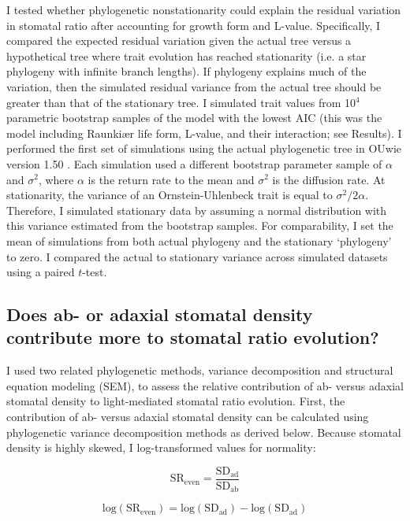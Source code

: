 \documentclass[12pt, oneside]{article}
\newcommand{\pkg}[1]{{\fontseries{b}\selectfont #1}}
\newcommand{\el}{L-value}
\begin{document}
I tested whether phylogenetic nonstationarity could explain the residual variation in stomatal ratio after accounting for growth form and \el. Specifically, I compared the expected residual variation given the actual tree versus a hypothetical tree where trait evolution has reached stationarity (i.e. a star phylogeny with infinite branch lengths). If phylogeny explains much of the variation, then the simulated residual variance from the actual tree should be greater than that of the stationary tree. I simulated trait values from 10$^4$ parametric bootstrap samples of the model with the lowest AIC (this was the model including Raunki\ae r life form, \el, and their interaction; see Results). I performed the first set of simulations using the actual phylogenetic tree in \pkg{OUwie} version 1.50 \citep{Beaulieu_OMeara_2016}. Each simulation used a different bootstrap parameter sample of $\alpha$ and $\sigma ^ 2$, where $\alpha$ is the return rate to the mean and $\sigma ^ 2$ is the diffusion rate. At stationarity, the variance of an Ornstein-Uhlenbeck trait is equal to $\sigma ^ 2 / 2 \alpha$. Therefore, I simulated stationary data by assuming a normal distribution with this variance estimated from the bootstrap samples. For comparability, I set the mean of simulations from both actual phylogeny and the stationary `phylogeny' to zero. I compared the actual to stationary variance across simulated datasets using a paired $t$-test.

\subsection*{Does ab- or adaxial stomatal density contribute more to stomatal ratio evolution?}

I used two related phylogenetic methods, variance decomposition and structural equation modeling (SEM), to assess the relative contribution of ab- versus adaxial stomatal density to light-mediated stomatal ratio evolution. First, the contribution of ab- versus adaxial stomatal density can be calculated using phylogenetic variance decomposition methods as derived below. Because stomatal density is highly skewed, I log-transformed values for normality:
 
\begin{equation} \label{eq:SReven2} 
  \mathrm{SR_{even}} = \frac{\mathrm{SD_{ad}}}{\mathrm{SD_{ab}}}
\end{equation}

\begin{equation} \label{eq:logSReven} 
  \mathrm{log(SR_{even})} = \mathrm{log(SD_{ad})} - \mathrm{log(SD_{ad})}
\end{equation}
\end{document}
